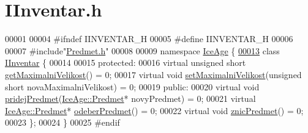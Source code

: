 \hypertarget{IInventar_8h_source}{}\section{I\+Inventar.\+h}
\label{IInventar_8h_source}

\begin{DoxyCode}
00001 
00004 \textcolor{preprocessor}{#ifndef IINVENTAR\_H}
00005 \textcolor{preprocessor}{#define IINVENTAR\_H}
00006 
00007 \textcolor{preprocessor}{#include"\hyperlink{Predmet_8h}{Predmet.h}"}
00008 
00009 \textcolor{keyword}{namespace }\hyperlink{namespaceIceAge}{IceAge} \{
\hypertarget{IInventar_8h_source.tex_l00013}{}\hyperlink{classIceAge_1_1IInventar}{00013}     \textcolor{keyword}{class }\hyperlink{classIceAge_1_1IInventar}{IInventar} \{
00014 
00015     \textcolor{keyword}{protected}:
00016         \textcolor{keyword}{virtual} \textcolor{keywordtype}{unsigned} \textcolor{keywordtype}{short} \hyperlink{classIceAge_1_1IInventar_a46150dc7d84c63e2db811b5fc243b199}{getMaximalniVelikost}() = 0;
00017         \textcolor{keyword}{virtual} \textcolor{keywordtype}{void} \hyperlink{classIceAge_1_1IInventar_a66f08152e516cf3c7278b400a1c71962}{setMaximalniVelikost}(\textcolor{keywordtype}{unsigned} \textcolor{keywordtype}{short} novaMaximalniVelikost) = 0;
00019     \textcolor{keyword}{public}:
00020         \textcolor{keyword}{virtual} \textcolor{keywordtype}{void} \hyperlink{classIceAge_1_1IInventar_a248376e6235356142020eed0373caf45}{pridejPredmet}(\hyperlink{classIceAge_1_1Predmet}{IceAge::Predmet}* novyPredmet) = 0;
00021         \textcolor{keyword}{virtual} \hyperlink{classIceAge_1_1Predmet}{IceAge::Predmet}* \hyperlink{classIceAge_1_1IInventar_ab1da82e4f21c19afbdb86017ed784d84}{odeberPredmet}() = 0;
00022         \textcolor{keyword}{virtual} \textcolor{keywordtype}{void} \hyperlink{classIceAge_1_1IInventar_a9ce63c75e643d7cbb6ab2e50a171a747}{znicPredmet}() = 0;
00023     \};
00024 \}
00025 \textcolor{preprocessor}{#endif}
\end{DoxyCode}
